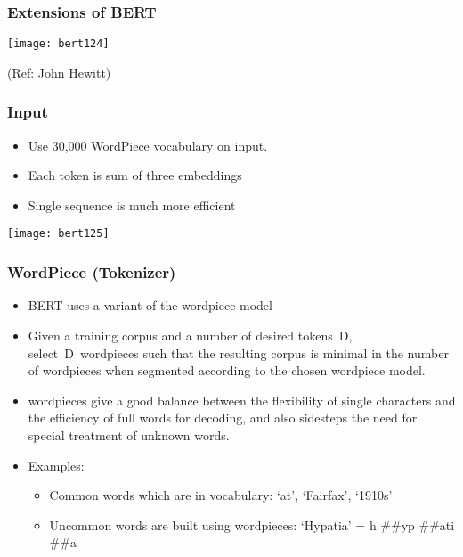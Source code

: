 \begin{frame}[fragile]\frametitle{Extensions of BERT}

			\begin{center}
			\texttt{[image: bert124]}
			\end{center}		
			
			{\tiny (Ref: John Hewitt)}

\end{frame}

\begin{frame}[fragile]\frametitle{Input}

		\begin{itemize}
		\item Use 30,000 WordPiece vocabulary on input. 
		\item Each token is sum of three embeddings 
		\item Single sequence is much more efficient
		\end{itemize}


			\begin{center}
			\texttt{[image: bert125]}
			\end{center}		
			

\end{frame}

\begin{frame}[fragile]\frametitle{WordPiece (Tokenizer)}

		\begin{itemize}
		\item BERT uses a variant of the wordpiece model
		\item Given a training corpus and a number of desired tokens D, select D wordpieces such that the resulting corpus is minimal in the number of wordpieces when segmented according to the chosen wordpiece model. 
		\item wordpieces give a good balance between the flexibility of single characters and the efficiency of full words for decoding, and also sidesteps the need for special treatment of unknown words.
		\item Examples:
				\begin{itemize}

		\item Common words which are in vocabulary: ‘at’, ‘Fairfax’, ‘1910s’
		\item Uncommon words are built using wordpieces: ‘Hypatia’ = h \#\#yp \#\#ati \#\#a
		\end{itemize}

		\end{itemize}

		

\end{frame}

